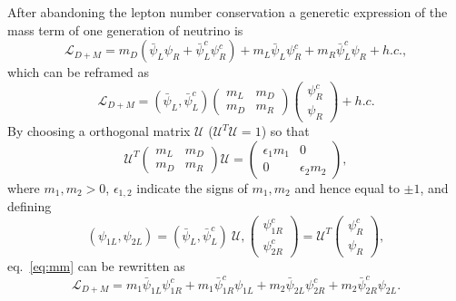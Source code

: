 After abandoning the lepton number conservation a generetic expression of the mass term of one generation of neutrino is
\begin{equation}
  \label{eq:dmm}
  \mathcal{L}_{D+M} = m_{D}(\bar{\psi}_{L}\psi_{R} +   \bar{\psi}^{c}_{L}\psi^{c}_{R}) +
  m_{L}\bar{\psi}_{L}\psi^{c}_{R} +   m_{R}\bar{\psi}^{c}_{L}\psi_{R} + h.c.,
\end{equation}
which can be reframed as
\begin{equation}
  \label{eq:mm}
  \mathcal{L}_{D+M} = (\bar{\psi}_{L},\bar{\psi}^{c}_{L})
  \left(\begin{array}{cc}m_L & m_D \\ m_D & m_R\end{array}\right)
  \left(\begin{array}{c}\psi^{c}_R \\ \psi_R\end{array}\right) + h.c.
\end{equation}
By choosing a orthogonal matrix $\mathcal{U}$ ($\mathcal{U}^{T} \mathcal{U} = 1$) so that
\begin{equation}
  \label{eq:mmat}
  \mathcal{U}^{T}\left(\begin{array}{cc}m_L & m_D \\ m_D &        m_R\end{array}\right)\mathcal{U} = 
  \left(\begin{array}{cc}\epsilon_{1}m_1 & 0 \\ 0 &             \epsilon_{2}m_2\end{array}\right),
\end{equation}
where $m_{1}, m_{2} > 0$, $\epsilon_{1,2}$ indicate the signs of $m_{1}, m_{2}$ and hence equal to $\pm 1$, and defining
\begin{equation}
  \label{eq:mvet}
  (\psi_{1L}, \psi_{2L}) = 
  (\bar{\psi}_{L}, \bar{\psi}^{c}_{L})~ \mathcal{U},
  \left(\begin{array}{c} \psi^{c}_{1R} \\             \psi^{c}_{2R}\end{array}\right) = \mathcal{U}^{T}
  \left(\begin{array}{c} \psi^{c}_{R} \\ \psi_{R} \end{array}\right),
\end{equation}
eq.~\ref{eq:mm} can be rewritten as
\begin{equation}
  \label{eq:m12}
  \mathcal{L}_{D+M} = m_{1}\bar{\psi}_{1L}\psi^{c}_{1R} +   m_{1}\bar{\psi}^{c}_{1R}\psi_{1L} +
  m_{2}\bar{\psi}_{2L}\psi^{c}_{2R} +   m_{2}\bar{\psi}^{c}_{2R}\psi_{2L}.
\end{equation}
